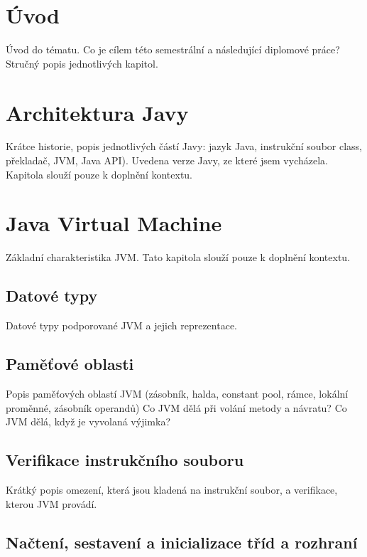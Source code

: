 
%
%


\chapter{Úvod}

Úvod do tématu. Co je cílem této semestrální a následující diplomové práce? Stručný popis jednotlivých kapitol.

\chapter{Architektura Javy}

Krátce historie, popis jednotlivých částí Javy: jazyk Java, instrukční soubor class, překladač, JVM, Java API).
Uvedena verze Javy, ze které jsem vycházela. Kapitola slouží pouze k doplnění kontextu.

\chapter{Java Virtual Machine}

Základní charakteristika JVM.
Tato kapitola slouží pouze k doplnění kontextu.

\section{Datové typy}

Datové typy podporované JVM a jejich reprezentace.

\section{Paměťové oblasti}

Popis paměťových oblastí JVM (zásobník, halda, constant pool, rámce, lokální proměnné, zásobník operandů)
Co JVM dělá při volání metody a návratu?
Co JVM dělá, když je vyvolaná výjimka?

\section{Verifikace instrukčního souboru}

Krátký popis omezení, která jsou kladená na instrukční soubor, a verifikace, kterou JVM provádí.

\section{Načtení, sestavení a inicializace tříd a rozhraní}


